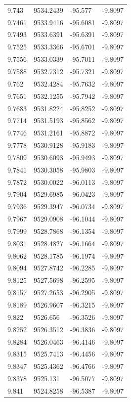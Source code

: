 \begin{table}[H]
\begin{tabular}{llll}
9.743 & 9534.2439 & -95.577 & -9.8097 \\
9.7461 & 9533.9416 & -95.6081 & -9.8097 \\
9.7493 & 9533.6391 & -95.6391 & -9.8097 \\
9.7525 & 9533.3366 & -95.6701 & -9.8097 \\
9.7556 & 9533.0339 & -95.7011 & -9.8097 \\
9.7588 & 9532.7312 & -95.7321 & -9.8097 \\
9.762 & 9532.4284 & -95.7632 & -9.8097 \\
9.7651 & 9532.1255 & -95.7942 & -9.8097 \\
9.7683 & 9531.8224 & -95.8252 & -9.8097 \\
9.7714 & 9531.5193 & -95.8562 & -9.8097 \\
9.7746 & 9531.2161 & -95.8872 & -9.8097 \\
9.7778 & 9530.9128 & -95.9183 & -9.8097 \\
9.7809 & 9530.6093 & -95.9493 & -9.8097 \\
9.7841 & 9530.3058 & -95.9803 & -9.8097 \\
9.7872 & 9530.0022 & -96.0113 & -9.8097 \\
9.7904 & 9529.6985 & -96.0423 & -9.8097 \\
9.7936 & 9529.3947 & -96.0734 & -9.8097 \\
9.7967 & 9529.0908 & -96.1044 & -9.8097 \\
9.7999 & 9528.7868 & -96.1354 & -9.8097 \\
9.8031 & 9528.4827 & -96.1664 & -9.8097 \\
9.8062 & 9528.1785 & -96.1974 & -9.8097 \\
9.8094 & 9527.8742 & -96.2285 & -9.8097 \\
9.8125 & 9527.5698 & -96.2595 & -9.8097 \\
9.8157 & 9527.2653 & -96.2905 & -9.8097 \\
9.8189 & 9526.9607 & -96.3215 & -9.8097 \\
9.822 & 9526.656 & -96.3526 & -9.8097 \\
9.8252 & 9526.3512 & -96.3836 & -9.8097 \\
9.8284 & 9526.0463 & -96.4146 & -9.8097 \\
9.8315 & 9525.7413 & -96.4456 & -9.8097 \\
9.8347 & 9525.4362 & -96.4766 & -9.8097 \\
9.8378 & 9525.131 & -96.5077 & -9.8097 \\
9.841 & 9524.8258 & -96.5387 & -9.8097 \\

\end{tabular}
\end{table}
